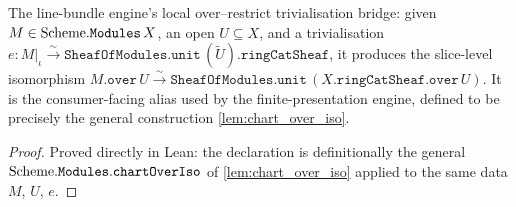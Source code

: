 \begin{definition}\leanok
  \label{def:linebundle_chart_over_iso}
  The line-bundle engine's local over--restrict trivialisation bridge: given
  \(M \in \mathrm{Scheme}.\mathtt{Modules}\,X\), an open \(U \subseteq X\), and a
  trivialisation \(e : M|_\iota \xrightarrow{\sim}
  \mathtt{SheafOfModules.unit}\,(\widetilde{U}).\mathtt{ringCatSheaf}\), it produces
  the slice-level isomorphism \(M.\mathtt{over}\,U \xrightarrow{\sim}
  \mathtt{SheafOfModules.unit}\,(X.\mathtt{ringCatSheaf}.\mathtt{over}\,U)\). It is the
  consumer-facing alias used by the finite-presentation engine, defined to be
  precisely the general construction \cref{lem:chart_over_iso}.
\end{definition}

\begin{proof}
  \leanok
  Proved directly in Lean: the declaration is definitionally the general
  \(\mathrm{Scheme}.\mathtt{Modules.chartOverIso}\) of \cref{lem:chart_over_iso} applied to
  the same data \(M\), \(U\), \(e\).
\end{proof}
